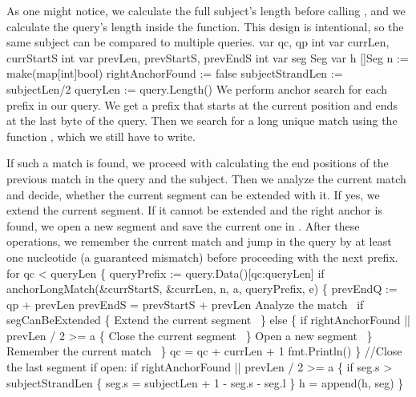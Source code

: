 As one might notice, we calculate the full subject's length before
calling , and we calculate the query's length
inside the function. This design is intentional, so the same subject
can be compared to multiple queries.
\nwenddocs{}\endmoddef\nwstartdeflinemarkup{}\nwenddeflinemarkup
var qc, qp int
var currLen, currStartS int
var prevLen, prevStartS, prevEndS int
var seg Seg
var h []Seg
n := make(map[int]bool)
rightAnchorFound := false
subjectStrandLen := subjectLen/2
queryLen := query.Length()
\nwendcode{}\nwdocspar
We perform anchor search for each prefix in our query. We get a prefix
that starts at the current position and ends at the last byte of the
query. Then we search for a long unique match using the function
, which we still have to write.

If such a match is found, we proceed with calculating the end
positions of the previous match in the query and the subject. Then we
analyze the current match and decide, whether the current segment can
be extended with it. If yes, we extend the current segment. If it
cannot be extended and the right anchor is found, we open a new
segment and save the current one in . After these operations, we
remember the current match and jump in the query by at least one
nucleotide (a guaranteed mismatch) before proceeding with the next
prefix.
\nwenddocs{}\endmoddef\nwstartdeflinemarkup{}\nwenddeflinemarkup
for qc < queryLen \{
          queryPrefix := query.Data()[qc:queryLen]
          if anchorLongMatch(&currStartS, &currLen,
                  n, a, queryPrefix, e) \{
                  prevEndQ := qp + prevLen
                  prevEndS = prevStartS + prevLen
                  \LA{}Analyze the match~{\nwtagstyle{}}\RA{}
                  if segCanBeExtended \{
                  \LA{}Extend the current segment~{\nwtagstyle{}}\RA{}
                  \} else \{
                          if rightAnchorFound || prevLen / 2 >= a \{
                                  \LA{}Close the current segment~{\nwtagstyle{}}\RA{}
                          \}
                          \LA{}Open a new segment~{\nwtagstyle{}}\RA{}
                  \}
                  \LA{}Remember the current match~{\nwtagstyle{}}\RA{}
          \}
          qc = qc + currLen + 1
          fmt.Println()
\}
//Close the last segment if open:
if rightAnchorFound || prevLen / 2 >= a \{
          if seg.s > subjectStrandLen \{
                  seg.s = subjectLen + 1 - seg.s - seg.l
          \}
          h = append(h, seg)
\}

